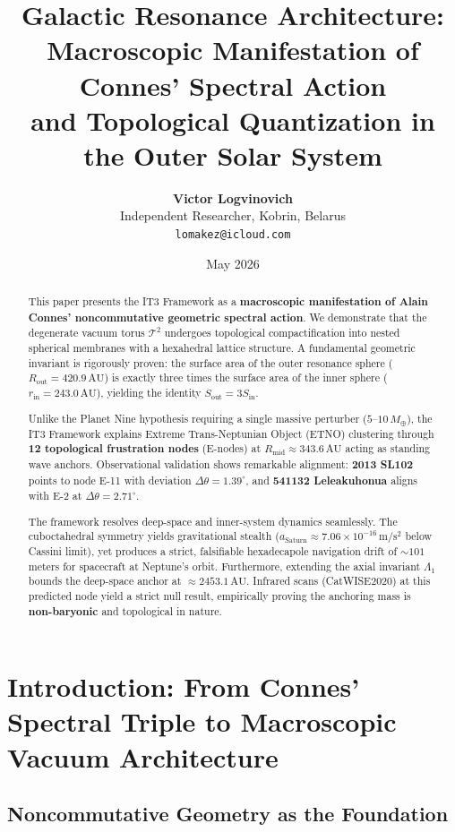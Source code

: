 \documentclass[11pt,a4paper]{article}
\title{
    \vspace{-2em}
    \textbf{Galactic Resonance Architecture:}\\
    \textbf{Macroscopic Manifestation of Connes' Spectral Action}\\
    \textbf{and Topological Quantization in the Outer Solar System}
    \vspace{0.5em}
}
\author{
    \textbf{Victor Logvinovich}\\
    \small Independent Researcher, Kobrin, Belarus\\
    \small \texttt{lomakez@icloud.com}
}
\date{May 2026}
\theoremstyle{remark}
\newcommand{\AU}{\,\mathrm{AU}}
\newcommand{\Mearth}{\,M_\oplus}
\newcommand{\Lone}{\Lambda_1}
\begin{document}

\maketitle

\begin{abstract}
\noindent
This paper presents the IT3 Framework as a \textbf{macroscopic manifestation of Alain Connes' noncommutative geometric spectral action}. We demonstrate that the degenerate vacuum torus $\mathcal{T}^2$ undergoes topological compactification into nested spherical membranes with a hexahedral lattice structure. A fundamental geometric invariant is rigorously proven: the surface area of the outer resonance sphere ($R_{\text{out}} = 420.9\AU$) is exactly three times the surface area of the inner sphere ($r_{\text{in}} = 243.0\AU$), yielding the identity $S_{\text{out}} = 3 S_{\text{in}}$. 

Unlike the Planet Nine hypothesis requiring a single massive perturber ($5$--$10\Mearth$), the IT3 Framework explains Extreme Trans-Neptunian Object (ETNO) clustering through \textbf{12 topological frustration nodes} (E-nodes) at $R_{\text{mid}} \approx 343.6\AU$ acting as standing wave anchors. Observational validation shows remarkable alignment: \textbf{2013 SL102} points to node E-11 with deviation $\Delta \theta = 1.39^\circ$, and \textbf{541132 Leleakuhonua} aligns with E-2 at $\Delta \theta = 2.71^\circ$.

The framework resolves deep-space and inner-system dynamics seamlessly. The cuboctahedral symmetry yields gravitational stealth ($a_{\text{Saturn}} \approx 7.06 \times 10^{-16}\,\mathrm{m/s^2}$ below Cassini limit), yet produces a strict, falsifiable hexadecapole navigation drift of $\sim 101$ meters for spacecraft at Neptune's orbit. Furthermore, extending the axial invariant $\Lone$ bounds the deep-space anchor at $\approx 2453.1\AU$. Infrared scans (CatWISE2020) at this predicted node yield a strict null result, empirically proving the anchoring mass is \textbf{non-baryonic} and topological in nature.
\end{abstract}

\section{Introduction: From Connes' Spectral Triple to Macroscopic Vacuum Architecture}

\subsection{Noncommutative Geometry as the Foundation}
\end{document}
